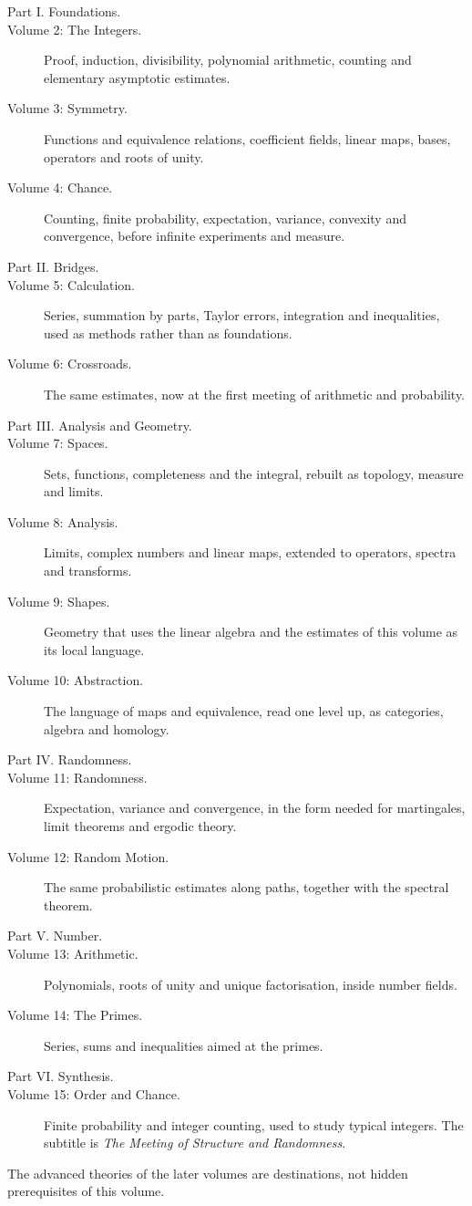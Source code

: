 \begin{description}
\item[Part I. Foundations.]
\item[Volume 2: The Integers.] Proof, induction, divisibility, polynomial
arithmetic, counting and elementary asymptotic estimates.
\item[Volume 3: Symmetry.] Functions and equivalence relations, coefficient
fields, linear maps, bases, operators and roots of unity.
\item[Volume 4: Chance.] Counting, finite probability, expectation, variance,
convexity and convergence, before infinite experiments and measure.
\item[Part II. Bridges.]
\item[Volume 5: Calculation.] Series, summation by parts, Taylor errors,
integration and inequalities, used as methods rather than as foundations.
\item[Volume 6: Crossroads.] The same estimates, now at the first meeting
of arithmetic and probability.
\item[Part III. Analysis and Geometry.]
\item[Volume 7: Spaces.] Sets, functions, completeness and the integral, rebuilt
as topology, measure and limits.
\item[Volume 8: Analysis.] Limits, complex numbers and linear maps,
extended to operators, spectra and transforms.
\item[Volume 9: Shapes.] Geometry that uses the linear algebra and the estimates
of this volume as its local language.
\item[Volume 10: Abstraction.] The language of maps and equivalence, read
one level up, as categories, algebra and homology.
\item[Part IV. Randomness.]
\item[Volume 11: Randomness.] Expectation, variance and convergence, in the form
needed for martingales, limit theorems and ergodic theory.
\item[Volume 12: Random Motion.] The same probabilistic estimates along paths,
together with the spectral theorem.
\item[Part V. Number.]
\item[Volume 13: Arithmetic.] Polynomials, roots of unity and unique factorisation,
inside number fields.
\item[Volume 14: The Primes.] Series, sums and inequalities aimed at the primes.
\item[Part VI. Synthesis.]
\item[Volume 15: Order and Chance.] Finite probability and integer counting,
used to study typical integers. The subtitle is \emph{The Meeting of Structure and Randomness}.
\end{description}

The advanced theories of the later volumes are destinations, not hidden prerequisites
of this volume.
